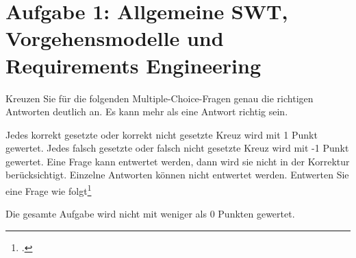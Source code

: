 \documentclass{bschlangaul-aufgabe}
\begin{document}


\section{Aufgabe 1: Allgemeine SWT, Vorgehensmodelle und Requirements
Engineering
}

Kreuzen Sie für die folgenden Multiple-Choice-Fragen genau die richtigen
Antworten deutlich an. Es kann mehr als eine Antwort richtig sein.

Jedes korrekt gesetzte oder korrekt nicht gesetzte Kreuz wird mit 1
Punkt gewertet. Jedes falsch gesetzte oder falsch nicht gesetzte Kreuz
wird mit -1 Punkt gewertet. Eine Frage kann entwertet werden, dann wird
sie nicht in der Korrektur berücksichtigt. Einzelne Antworten können
nicht entwertet werden. Entwerten Sie eine Frage wie
folgt\footcite{examen:46116:2014:09}

Die gesamte Aufgabe wird nicht mit weniger als 0 Punkten gewertet.
\end{document}
